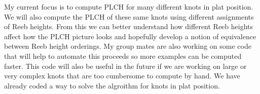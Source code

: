 \documentclass[11pt,oneside]{amsart}
\begin{document}
My current focus is to compute PLCH for many different knots in plat position. We will also compute the PLCH of these same knots using different assignments of Reeb heights. From this we can better understand how different Reeb heights affect how the PLCH picture looks and hopefully develop a notion of equivalence between Reeb height orderings. My group mates are also working on some code that will help to automate this proceeds so more examples can be computed faster. This code will also be useful in the future if we are working on large or very complex knots that are too cumbersome to compute by hand. We have already coded a way to solve the algroithm for knots in plat position.
\end{document}
